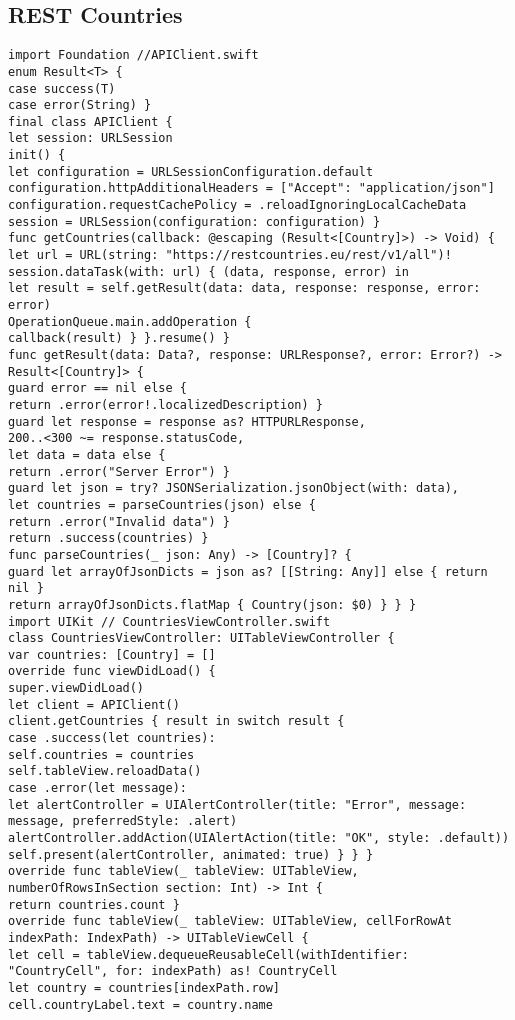 \subsection{REST Countries}
\begin{lstlisting}
import Foundation //APIClient.swift
enum Result<T> {
case success(T)
case error(String) }
final class APIClient {
let session: URLSession
init() {
let configuration = URLSessionConfiguration.default
configuration.httpAdditionalHeaders = ["Accept": "application/json"]
configuration.requestCachePolicy = .reloadIgnoringLocalCacheData
session = URLSession(configuration: configuration) }
func getCountries(callback: @escaping (Result<[Country]>) -> Void) {
let url = URL(string: "https://restcountries.eu/rest/v1/all")!
session.dataTask(with: url) { (data, response, error) in
let result = self.getResult(data: data, response: response, error: error)
OperationQueue.main.addOperation {
callback(result) } }.resume() }
func getResult(data: Data?, response: URLResponse?, error: Error?) -> Result<[Country]> {
guard error == nil else {
return .error(error!.localizedDescription) }
guard let response = response as? HTTPURLResponse,
200..<300 ~= response.statusCode,
let data = data else {
return .error("Server Error") }
guard let json = try? JSONSerialization.jsonObject(with: data),
let countries = parseCountries(json) else {
return .error("Invalid data") }
return .success(countries) }
func parseCountries(_ json: Any) -> [Country]? {
guard let arrayOfJsonDicts = json as? [[String: Any]] else { return nil }
return arrayOfJsonDicts.flatMap { Country(json: $0) } } }
import UIKit // CountriesViewController.swift
class CountriesViewController: UITableViewController {
var countries: [Country] = []
override func viewDidLoad() {
super.viewDidLoad()
let client = APIClient()
client.getCountries { result in switch result {
case .success(let countries):
self.countries = countries
self.tableView.reloadData()
case .error(let message):
let alertController = UIAlertController(title: "Error", message: message, preferredStyle: .alert)
alertController.addAction(UIAlertAction(title: "OK", style: .default))
self.present(alertController, animated: true) } } }
override func tableView(_ tableView: UITableView, numberOfRowsInSection section: Int) -> Int {
return countries.count }
override func tableView(_ tableView: UITableView, cellForRowAt indexPath: IndexPath) -> UITableViewCell {
let cell = tableView.dequeueReusableCell(withIdentifier: "CountryCell", for: indexPath) as! CountryCell
let country = countries[indexPath.row]
cell.countryLabel.text = country.name

\end{lstlisting}
